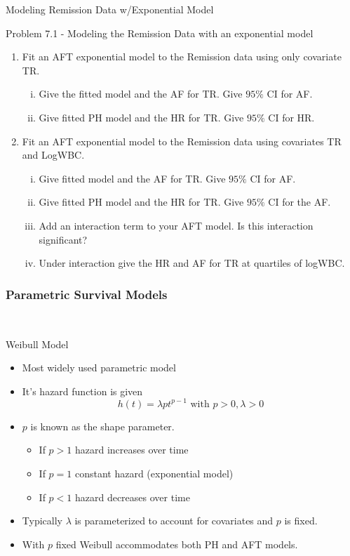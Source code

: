 \documentclass{beamer}
\theoremstyle{definition}
\begin{document}
 \begin{frame}{Modeling Remission Data w/Exponential Model}
\begin{block}{Problem 7.1 - Modeling the Remission Data with an exponential model}
\begin{enumerate}
\item Fit an AFT exponential model to the Remission data using only covariate TR.
\begin{enumerate}[i.]
\item Give the fitted model and the AF for TR. Give $95\%$ CI for AF.
\item Give fitted PH model and the HR  for TR. Give $95\%$ CI for HR.
\end{enumerate}
\item Fit an AFT exponential model to the Remission data using covariates TR and LogWBC.
\begin{enumerate}[i.]
\item Give fitted model and the AF for TR. Give $95\%$ CI for AF.
\item Give fitted PH model and the HR for TR. Give $95\%$ CI for the AF.
\item Add an interaction term to your AFT model. Is this interaction significant?
\item Under interaction give the HR and AF for TR at quartiles of logWBC.
\end{enumerate}
\end{enumerate}
 \end{block}
 \end{frame}

\begin{frame} 
\frametitle{Parametric Survival Models}\
\begin{block}{Weibull Model} 
\begin{itemize}
\item Most widely used parametric model 
\item It's hazard function is given
\[ h(t) = \lambda p t^{p-1} \text{ with } p>0, \lambda >0 
\]
\item $p$ is known as the shape parameter. 
\begin{itemize}
\item If $p>1$ hazard increases over time
\item If $p=1$ constant hazard (exponential model)
\item If $p<1$ hazard decreases over time
\end{itemize}
\item Typically $\lambda$ is parameterized to account for covariates and $p$ is fixed.
\item With $p$ fixed Weibull accommodates both PH and AFT models. 
\end{itemize} 
\end{block}
\end{frame} 
 
\end{document}
